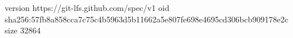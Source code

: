 version https://git-lfs.github.com/spec/v1
oid sha256:57fb8a858cca7c75c4b5963d5b11662a5e807fe698e4695cd306bcb909178e2c
size 32864

